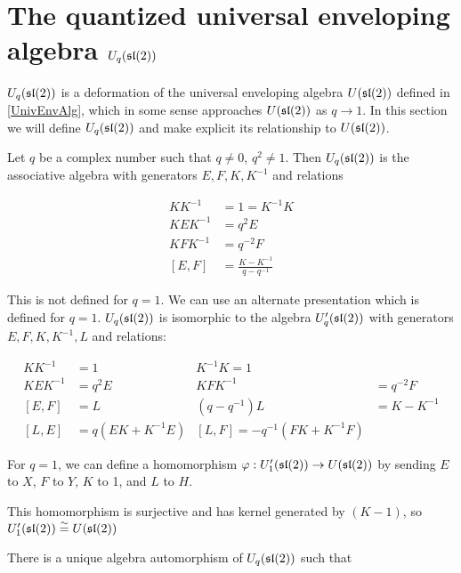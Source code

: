 \section{The quantized universal enveloping algebra $U_q(\mathfrak{sl}(2))$}

$U_q(\mathfrak{sl}(2))$ is a deformation of the universal enveloping algebra
$U(\mathfrak{sl}(2))$ defined in \ref{UnivEnvAlg}, which in some sense approaches
$U(\mathfrak{sl}(2))$ as $q \to 1$. In this section we will define $U_q(\mathfrak{sl}(2))$ and
make explicit its relationship to $U(\mathfrak{sl}(2))$.

Let $q$ be a complex number such that $q \neq 0$, $q^2 \neq 1$.  Then
$U_q(\mathfrak{sl}(2))$ is the associative algebra with generators $E,F,K, K^{-1}$ and
relations 

\begin{align}
    KK^{-1} &= 1 = K^{-1}K \\
    KEK^{-1} &= q^2 E \\
    KFK^{-1} &= q^{-2} F \\
    [E,F] &= \frac{K - K^{-1}}{q - q^{-1}}
\end{align}



This is not defined for $q = 1$. We can use an alternate presentation which is
defined for $q = 1$. $U_q(\mathfrak{sl}(2))$ is isomorphic to the algebra
$U'_q(\mathfrak{sl}(2))$ with generators $E,F,K,K^{-1},L$ and relations:

\begin{align}
    KK^{-1} &= 1 &  K^{-1}K  =1 \\
    KEK^{-1} &= q^2 E & KFK^{-1} &= q^{-2} F \\
    [E,F] &= L  & (q - q^{-1})L &= K-K^{-1} \\
    [L,E] &= q(EK + K^{-1}E) & [L,F] = -q^{-1}(FK + K^{-1}F)
\end{align}

For $q=1$, we can define a homomorphism $\varphi: U'_1(\mathfrak{sl}(2)) \to
U(\mathfrak{sl}(2))$ by sending $E$ to $X$, $F$ to $Y$, $K$ to 1, and $L$ to $H$. 
\begin{lemma}
This homomorphism is surjective and has kernel generated by $(K-1)$, so
$U'_1(\mathfrak{sl}(2)) \stackrel{\sim}{=} U(\mathfrak{sl}(2))$
\end{lemma}

There is a unique algebra automorphism of $U_q(\mathfrak{sl}(2))$ such that 

